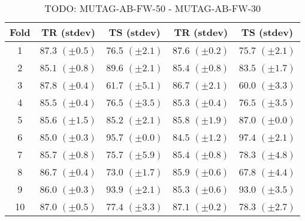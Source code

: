 \documentclass[10pt,a4paper]{book}
\begin{document}
\begin{table}[tbph]
\caption{TODO: MUTAG-AB-FW-50 - MUTAG-AB-FW-30}
\label{TODO}
\centering
\begin{tabular}{c*{4}{c}}
\toprule
Fold & TR (stdev) & TS (stdev) & TR (stdev) & TS (stdev)\\
\midrule
1 & $87.3$ $(\pm 0.5)$ & $76.5$ $(\pm 2.1)$ & $87.6$ $(\pm 0.2)$ & $75.7$ $(\pm 2.1)$\\
2 & $85.1$ $(\pm 0.8)$ & $89.6$ $(\pm 2.1)$ & $85.4$ $(\pm 0.8)$ & $83.5$ $(\pm 1.7)$\\
3 & $87.8$ $(\pm 0.4)$ & $61.7$ $(\pm 5.1)$ & $86.7$ $(\pm 2.1)$ & $60.0$ $(\pm 3.3)$\\
4 & $85.5$ $(\pm 0.4)$ & $76.5$ $(\pm 3.5)$ & $85.3$ $(\pm 0.4)$ & $76.5$ $(\pm 3.5)$\\
5 & $85.6$ $(\pm 1.5)$ & $85.2$ $(\pm 2.1)$ & $85.8$ $(\pm 1.9)$ & $87.0$ $(\pm 0.0)$\\
6 & $85.0$ $(\pm 0.3)$ & $95.7$ $(\pm 0.0)$ & $84.5$ $(\pm 1.2)$ & $97.4$ $(\pm 2.1)$\\
7 & $85.7$ $(\pm 0.8)$ & $75.7$ $(\pm 5.9)$ & $85.4$ $(\pm 0.8)$ & $78.3$ $(\pm 4.8)$\\
8 & $86.7$ $(\pm 0.4)$ & $73.0$ $(\pm 1.7)$ & $85.9$ $(\pm 0.6)$ & $67.8$ $(\pm 4.4)$\\
9 & $86.0$ $(\pm 0.3)$ & $93.9$ $(\pm 2.1)$ & $85.3$ $(\pm 0.6)$ & $93.0$ $(\pm 3.5)$\\
10 & $87.0$ $(\pm 0.5)$ & $77.4$ $(\pm 3.3)$ & $87.1$ $(\pm 0.2)$ & $78.3$ $(\pm 2.7)$\\
\bottomrule
\end{tabular}
\end{table}


\end{document}
